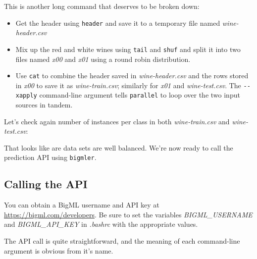\documentclass[
]{book}
\newenvironment{Shaded}{\begin{snugshade}}{\end{snugshade}}
\newcommand{\BuiltInTok}[1]{#1}
\newcommand{\DataTypeTok}[1]{\textcolor[rgb]{0.13,0.29,0.53}{#1}}
\newcommand{\ExtensionTok}[1]{#1}
\newcommand{\NormalTok}[1]{#1}
\providecommand{\tightlist}{%
  \setlength{\itemsep}{0pt}\setlength{\parskip}{0pt}}
\theoremstyle{definition}
\theoremstyle{definition}
\theoremstyle{definition}
\theoremstyle{remark}
\begin{document}
This is another long command that deserves to be broken down:

\begin{itemize}
\tightlist
\item
  Get the header using \texttt{header} and save it to a temporary file named \emph{wine-header.csv}
\item
  Mix up the red and white wines using \texttt{tail} and \texttt{shuf} and split it into two files named \emph{x00} and \emph{x01} using a round robin distribution.
\item
  Use \texttt{cat} to combine the header saved in \emph{wine-header.csv} and the rows stored in \emph{x00} to save it as \emph{wine-train.csv}; similarly for \emph{x01} and \emph{wine-test.csv}. The \texttt{-\/-xapply} command-line argument tells \texttt{parallel} to loop over the two input sources in tandem.
\end{itemize}

Let's check again number of instances per class in both \emph{wine-train.csv} and \emph{wine-test.csv}:

\begin{Shaded}
\end{Shaded}

That looks like are data sets are well balanced. We're now ready to call the prediction API using \texttt{bigmler}.

\hypertarget{calling-the-api}{%
\subsection{Calling the API}\label{calling-the-api}}

\begin{rmdnote}
You can obtain a BigML username and API key at \url{https://bigml.com/developers}. Be sure to set the variables \emph{BIGML\_USERNAME} and \emph{BIGML\_API\_KEY} in \emph{.bashrc} with the appropriate values.
\end{rmdnote}

The API call is quite straightforward, and the meaning of each command-line argument is obvious from it's name.
\end{document}
